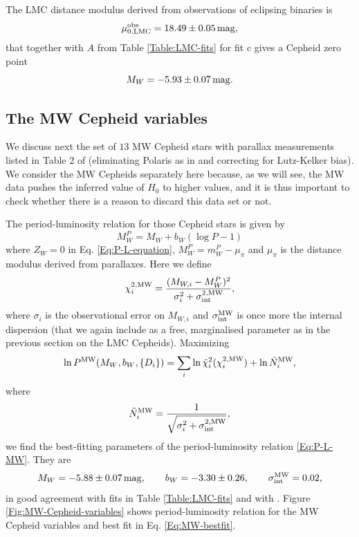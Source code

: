 The LMC distance modulus derived from observations of eclipsing binaries \cite{Pietrzynski:2013gia} is 
\begin{equation}
\mu_{0,\mathrm{LMC}}^{\mathrm{obs}} = 18.49 \pm 0.05\, \mathrm{mag},
\label{Eq:LMC-measured-distance-modulus}
\end{equation}
that together with $A$ from Table \ref{Table:LMC-fits} for fit c gives a Cepheid zero point
\begin{equation}\label{Eq:zero-point-LMC}
M_W = -5.93 \pm 0.07\, \mathrm{mag}.
\end{equation}


\subsection{The MW Cepheid variables}
\label{Subsection:MW-1}

We discuss next the set of $13$ MW Cepheid stars with parallax measurements listed in Table 2 of \cite{vanLeeuwen:2007xw} (eliminating Polaris as in \cite{Efstathiou:2013via} and correcting for Lutz-Kelker bias). We consider the MW Cepheids separately here because, as we will see, the MW data pushes the inferred value of $H_0$ to higher values, and it is thus important to check whether there is a reason to discard this data set or not.

The period-luminosity relation for those Cepheid stars is given by
\begin{equation}\label{Eq:P-L-MW}
M^P_W = M_W + b_W (\log P - 1)
\end{equation}
where $Z_W=0$ in Eq. \eqref{Eq:P-L-equation}, $M^P_W = m^P_W - \mu_{\pi}$ and $\mu_\pi$ is the distance modulus derived from parallaxes. Here we define 
\begin{equation}\label{Eq:chi2-MW}
\chi^{2,\mathrm{MW}}_{i} = \frac{(M_{W,i} - M^P_{W})^2}{\sigma_i^2 + \sigma^{2,\mathrm{MW}}_{\mathrm{int}}},
\end{equation}
where $\sigma_i$ is the observational error on $M_{W,i}$ and $\sigma_{\mathrm{int}}^{\mathrm{MW}}$ is once more the internal dispersion (that we again include as a free, marginalised parameter as in the previous section on the LMC Cepheids). Maximizing  
\begin{equation}
\label{Eq:likelihood-HP-MW}
\ln P^{\mathrm{MW}}(M_W,b_W,\lbrace D_i \rbrace) = \sum_{i} \ln \tilde{\chi}_i^{2}(\chi^{2,\mathrm{MW}}_{i}) + \ln \tilde{N}^{\mathrm{MW}}_{i},
\end{equation}
where 
\begin{equation}
\label{Eq:normalization-MW}
\tilde{N}^{\mathrm{MW}}_i = \frac{1}{\sqrt{\sigma_i^2 +\sigma^{2,\mathrm{MW}}_{\mathrm{int}}}},
\end{equation}
we find the best-fitting parameters of the period-luminosity relation \eqref{Eq:P-L-MW}. They are 
\begin{equation}\label{Eq:MW-bestfit}
M_W = -5.88 \pm 0.07\,\mathrm{mag}  , \qquad b_W = -3.30 \pm 0.26  , \qquad \sigma_{\mathrm{int}}^{\mathrm{MW}} = 0.02 ,
\end{equation}
in good agreement with fits in Table \ref{Table:LMC-fits} and with \cite{Efstathiou:2013via}. 
Figure \ref{Fig:MW-Cepheid-variables} shows period-luminosity relation for the MW Cepheid variables and best fit in Eq. \eqref{Eq:MW-bestfit}.

